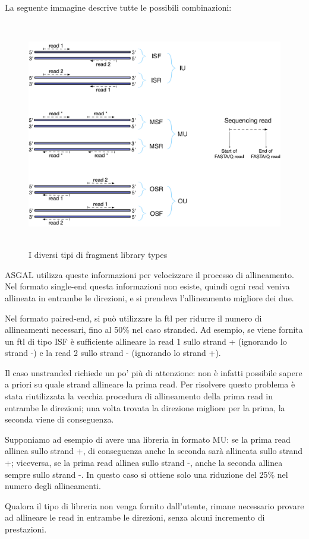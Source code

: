 La seguente immagine descrive tutte le possibili combinazioni:
\begin{figure}[h!]
	\centering
	\includegraphics[width=\linewidth, height=10cm]{images/fragmentlibrarytypes.png}
  \caption{I diversi tipi di fragment library types}
  \label{fig:FragmentLibraryTypes}
\end{figure}

\newpage

ASGAL utilizza queste informazioni per velocizzare il processo di allineamento. Nel formato single-end questa informazioni non esiste, quindi ogni read veniva allineata in entrambe le direzioni, e si prendeva l'allineamento migliore dei due. 

Nel formato paired-end, si può utilizzare la ftl per ridurre il numero di allineamenti necessari, fino al 50\% nel caso stranded. Ad esempio, se viene fornita un ftl di tipo ISF è sufficiente allineare la read 1 sullo strand + (ignorando lo strand -) e la read 2 sullo strand - (ignorando lo strand +).

Il caso unstranded richiede un po' più di attenzione: non è infatti possibile sapere a priori su quale strand allineare la prima read. Per risolvere questo problema è stata riutilizzata la vecchia procedura di allineamento della prima read in entrambe le direzioni; una volta trovata la direzione migliore per la prima, la seconda viene di conseguenza. 

Supponiamo ad esempio di avere una libreria in formato MU: se la prima read allinea sullo strand +, di conseguenza anche la seconda sarà allineata sullo strand +; viceversa, se la prima read allinea sullo strand -, anche la seconda allinea sempre sullo strand -. In questo caso si ottiene solo una riduzione del 25\% nel numero degli allineamenti.

Qualora il tipo di libreria non venga fornito dall'utente, rimane necessario provare ad allineare le read in entrambe le direzioni, senza alcuni incremento di prestazioni.


